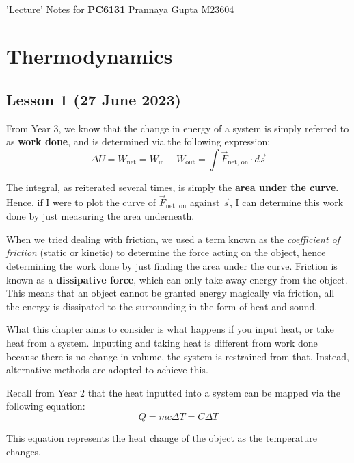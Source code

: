\documentclass[11pt]{article}
\begin{document}
\thispagestyle{empty}
\bigskip \
\vspace{0.1cm}

\begin{center}
{\fontsize{22}{22} \selectfont 'Lecture' Notes for}
\vskip 16pt
{\fontsize{36}{36} \selectfont \bf \sffamily PC6131}
\vskip 24pt
{\fontsize{18}{18} \selectfont \rmfamily Prannaya Gupta} 
\vskip 6pt
{\fontsize{14}{14} \selectfont \ttfamily M23604} 
\vskip 24pt
\end{center}


\microtoc
\newpage

\section{Thermodynamics}
\subsection{Lesson 1 (27 June 2023)}

From Year 3, we know that the change in energy of a system is simply referred to as \textbf{work done}, and is determined via the following expression:
$$\Delta U = W_\text{net} = W_\text{in} - W_\text{out} = \int \overrightarrow{F}_\text{net, on} \cdot d\vec{s}$$

The integral, as reiterated several times, is simply the \textbf{area under the curve}. Hence, if I were to plot the curve of $\overrightarrow{F}_\text{net, on}$ against $\vec{s}$, I can determine this work done by just measuring the area underneath.

When we tried dealing with friction, we used a term known as the \textit{coefficient of friction} (static or kinetic) to determine the force acting on the object, hence determining the work done by just finding the area under the curve. Friction is known as a \textbf{dissipative force}, which can only take away energy from the object. This means that an object cannot be granted energy magically via friction, all the energy is dissipated to the surrounding in the form of heat and sound.

What this chapter aims to consider is what happens if you input heat, or take heat from a system. Inputting and taking heat is different from work done because there is no change in volume, the system is restrained from that. Instead, alternative methods are adopted to achieve this.

Recall from Year 2 that the heat inputted into a system can be mapped via the following equation:
$$Q = mc\Delta T = C\Delta T$$

This equation represents the heat change of the object as the temperature changes.
\end{document}
